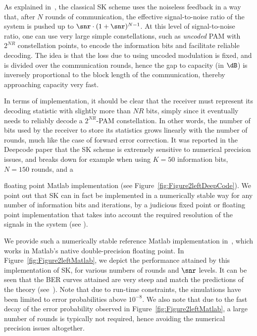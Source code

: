 As explained in~\cite{ben2017interactive}, the classical SK scheme uses the noiseless feedback in a way that, after $N$ rounds of communication, the effective signal-to-noise ratio of the system is pushed up to $\snr\cdot(1+ \snr)^{N-1}$. At this level of signal-to-noise ratio, one can use very large simple constellations, such as \textit{uncoded} PAM with $2^{NR}$ constellation points, to encode the information bits and facilitate reliable decoding. The idea is that the loss due to using uncoded modulation is fixed, and is divided over the communication rounds, hence the gap to capacity (in $\dB$) is inversely proportional to the block length of the communication, thereby approaching capacity very fast.

In terms of implementation, it should be clear that the receiver must represent its decoding statistic with slightly more than $NR$ bits, simply since it eventually needs to reliably decode a $2^{NR}$-PAM constellation. In other words, the number of bits used by the receiver to store its statistics grows linearly with the number of rounds, much like the case of forward error correction. It was reported in the Deepcode paper that the SK scheme is extremely sensitive to numerical precision issues, and breaks down for example when using $K=50$ information bits, $N=150$ rounds, and a 

floating point Matlab implementation (see Figure~\ref{fig:Figure2leftDeepCode}). We point out that SK can in fact be implemented in a numerically stable way for any number of information bits and iterations, by a judicious fixed point or floating point implementation that takes into account the required resolution of the signals in the system (see \cite[p. 2419]{ben2017interactive}). 

We provide such a numerically stable reference Matlab implementation in~\cite{ModuloSKcode}, which works in Matlab's native double-precision floating point. In Figure~\ref{fig:Figure2leftMatlab}, we depict the performance attained by this implementation of SK, for various numbers of rounds and $\snr$ levels. It can be seen that the BER curves attained are very steep and match the predictions of the theory (see~\cite{ben2017interactive}). Note that due to run-time constraints, the simulations have been limited to error probabilities above $10^{-8}$. 
We also note that due to the fast decay of the error probability observed in Figure~\ref{fig:Figure2leftMatlab}, a large number of rounds is typically not required, hence avoiding the numerical precision issues altogether.

